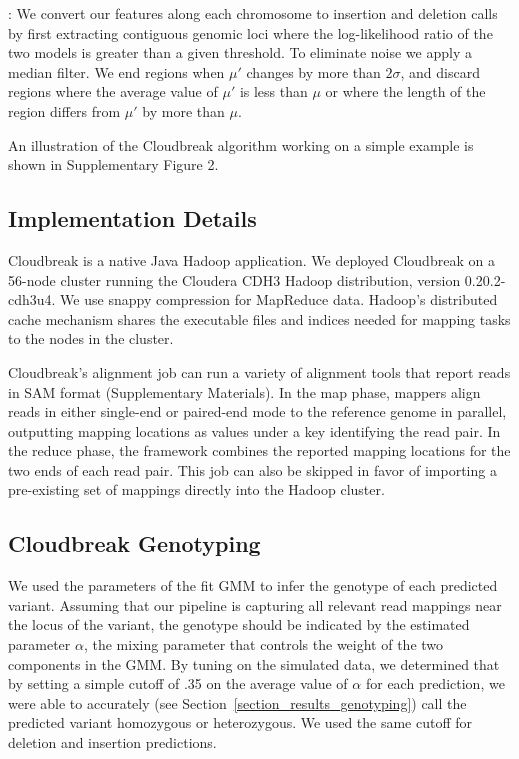 \documentclass{bioinfo}
\newcommand{\todo}[1]{}
\begin{document}
\begin{methods}
\textbf{}: We convert our features along each chromosome to insertion and deletion calls by first extracting contiguous genomic loci where the log-likelihood ratio of the two models is greater than a given threshold. To eliminate noise we apply a median filter. We end regions when $\mu'$ changes by more than $2\sigma$, and discard regions where the average value of $\mu'$ is less than $\mu$ or where the length of the region differs from $\mu'$ by more than $\mu$.

An illustration of the Cloudbreak algorithm working on a simple example is shown in Supplementary Figure 2\todo{\ref{Salgorithm_example}}.

\subsection{Implementation Details}

Cloudbreak is a native Java Hadoop application. We deployed Cloudbreak on a 56-node cluster running the Cloudera CDH3 Hadoop distribution, version 0.20.2-cdh3u4. We use snappy compression for MapReduce data. Hadoop's distributed cache mechanism shares the executable files and indices needed for mapping tasks to the nodes in the cluster. 

Cloudbreak's alignment job can run a variety of alignment tools that report reads in SAM format (Supplementary Materials). In the map phase, mappers align reads in either single-end or paired-end mode to the reference genome in parallel, outputting mapping locations as values under a key identifying the read pair. In the reduce phase, the framework combines the reported mapping locations for the two ends of each read pair. This job can also be skipped in favor of importing a pre-existing set of mappings directly into the Hadoop cluster.

\subsection{Cloudbreak Genotyping}
We used the parameters of the fit GMM to infer the genotype of each predicted variant. Assuming that our pipeline is capturing all relevant read mappings near the locus of the variant, the genotype should be indicated by the estimated parameter $\alpha$, the mixing parameter that controls the weight of the two components in the GMM. By tuning on the simulated data, we determined that by setting a simple cutoff of .35 on the average value of $\alpha$ for each prediction, we were able to accurately (see Section~\ref{section_results_genotyping}) call the predicted variant homozygous or heterozygous. We used the same cutoff for deletion and insertion predictions.


\end{methods}
\end{document}
